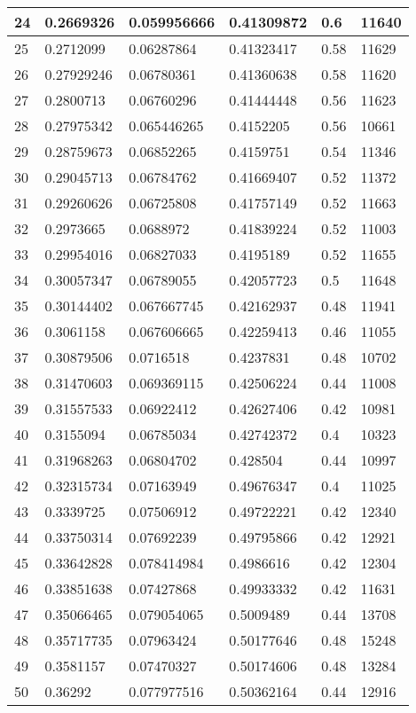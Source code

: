 \begin{longtable}{|l|l|l|l|l|l|}
24 & 0.2669326 & 0.059956666 & 0.41309872 & 0.6 & 11640 \\ \hline 
25 & 0.2712099 & 0.06287864 & 0.41323417 & 0.58 & 11629 \\ \hline 
26 & 0.27929246 & 0.06780361 & 0.41360638 & 0.58 & 11620 \\ \hline 
27 & 0.2800713 & 0.06760296 & 0.41444448 & 0.56 & 11623 \\ \hline 
28 & 0.27975342 & 0.065446265 & 0.4152205 & 0.56 & 10661 \\ \hline 
29 & 0.28759673 & 0.06852265 & 0.4159751 & 0.54 & 11346 \\ \hline 
30 & 0.29045713 & 0.06784762 & 0.41669407 & 0.52 & 11372 \\ \hline 
31 & 0.29260626 & 0.06725808 & 0.41757149 & 0.52 & 11663 \\ \hline 
32 & 0.2973665 & 0.0688972 & 0.41839224 & 0.52 & 11003 \\ \hline 
33 & 0.29954016 & 0.06827033 & 0.4195189 & 0.52 & 11655 \\ \hline 
34 & 0.30057347 & 0.06789055 & 0.42057723 & 0.5 & 11648 \\ \hline 
35 & 0.30144402 & 0.067667745 & 0.42162937 & 0.48 & 11941 \\ \hline 
36 & 0.3061158 & 0.067606665 & 0.42259413 & 0.46 & 11055 \\ \hline 
37 & 0.30879506 & 0.0716518 & 0.4237831 & 0.48 & 10702 \\ \hline 
38 & 0.31470603 & 0.069369115 & 0.42506224 & 0.44 & 11008 \\ \hline 
39 & 0.31557533 & 0.06922412 & 0.42627406 & 0.42 & 10981 \\ \hline 
40 & 0.3155094 & 0.06785034 & 0.42742372 & 0.4 & 10323 \\ \hline 
41 & 0.31968263 & 0.06804702 & 0.428504 & 0.44 & 10997 \\ \hline 
42 & 0.32315734 & 0.07163949 & 0.49676347 & 0.4 & 11025 \\ \hline 
43 & 0.3339725 & 0.07506912 & 0.49722221 & 0.42 & 12340 \\ \hline 
44 & 0.33750314 & 0.07692239 & 0.49795866 & 0.42 & 12921 \\ \hline 
45 & 0.33642828 & 0.078414984 & 0.4986616 & 0.42 & 12304 \\ \hline 
46 & 0.33851638 & 0.07427868 & 0.49933332 & 0.42 & 11631 \\ \hline 
47 & 0.35066465 & 0.079054065 & 0.5009489 & 0.44 & 13708 \\ \hline 
48 & 0.35717735 & 0.07963424 & 0.50177646 & 0.48 & 15248 \\ \hline 
49 & 0.3581157 & 0.07470327 & 0.50174606 & 0.48 & 13284 \\ \hline 
50 & 0.36292 & 0.077977516 & 0.50362164 & 0.44 & 12916 \\ \hline 
\end{longtable}